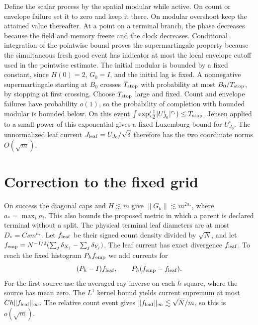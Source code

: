\documentclass[11pt]{article}
\begin{document}
Define the scalar process by the spatial modular while active.
On count or envelope failure set it to zero and keep it there.
On modular overshoot keep the attained value thereafter.
At a point on a terminal branch, the phase decreases because
the field and memory freeze and the clock decreases.
Conditional integration of the pointwise bound proves the
supermartingale property because the simultaneous fresh good event
has indicator at most the local envelope cutoff used in the
pointwise estimate. The initial modular is bounded by a fixed
constant, since \(H(0)=2\), \(G_0=I\), and the initial lag is
fixed. A nonnegative supermartingale starting at \(B_0\)
crosses \(T_{\rm stop}\) with probability at most
\(B_0/T_{\rm stop}\), by stopping at first crossing.
Choose \(T_{\rm stop}\) large and fixed. Count and envelope
failures have probability \(o(1)\), so the probability of
completion with bounded modular is bounded below.
On this event \(\int\exp(\tfrac12|U_{J_0}^i|^{r_i})\le
T_{\rm stop}\). Jensen applied to a small power of this
exponential gives a fixed Luxemburg bound for \(U_{J_0}^i\).
The unnormalized leaf current \(J_{\rm leaf}=U_{J_0}/\sqrt\delta\)
therefore has the two coordinate norms \(O(\sqrt m)\).

\section{Correction to the fixed grid}\label{sec:correction}

On success the diagonal caps and \(H\lesssim m\) give
\(\|G_k\|\lesssim m^{2a_*}\), where \(a_*=\max_i a_i\).
This also bounds the proposed metric in which a parent is
declared terminal without a split. The physical terminal
leaf diameters are at most \(D_*=C s m^{a_*}\).
Let \(f_{\rm leaf}\) be their signed count density divided by
\(\sqrt N\), and let
\(f_{\rm emp}=N^{-1/2}(\sum_j\delta_{X_j}-\sum_j\delta_{Y_j})\).
The leaf current has exact divergence \(f_{\rm leaf}\).
To reach the fixed histogram \(P_h f_{\rm emp}\) we add
currents for
\[
 (P_h-I)f_{\rm leaf},\qquad P_h(f_{\rm emp}-f_{\rm leaf}).
\]
For the first source use the averaged-ray inverse on
each \(h\)-square, where the source has mean zero.
The \(L^1\) kernel bound yields current supremum at most
\(Ch\|f_{\rm leaf}\|_\infty\). The relative count event gives
\(\|f_{\rm leaf}\|_\infty\lesssim\sqrt N/m\), so this is
\(o(\sqrt m)\).
\end{document}
